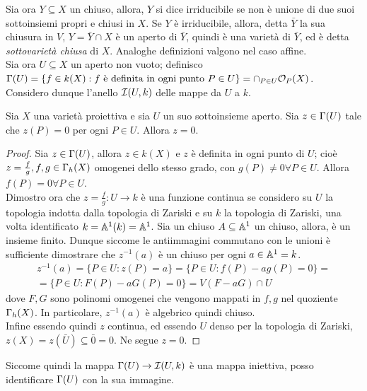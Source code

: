         Sia ora $Y \subseteq X$ un chiuso, allora, $Y$ si dice irriducibile se non è unione di due suoi sottoinsiemi propri e chiusi in $X$. Se $Y$ è irriducibile, allora, detta $\bar{Y}$ 
        la sua chiusura in $V$, $Y = \bar{Y} \cap X$ è un aperto di $\bar{Y}$, quindi è una varietà di $\bar{Y}$, ed è detta \emph{sottovarietà chiusa} di $X$.
        Analoghe definizioni valgono nel caso affine. \\
        Sia ora $U \subseteq X$ un aperto non vuoto; definisco $\Gamma(U) = \{f \in k(X) : f \text{ è definita in ogni punto } P \in U\} = \cap_{P \in U} \mathcal{O}_P(X)$. \\
        Considero dunque l'anello $\mathcal{I}(U,k)$ delle mappe da $U$ a $k$.
        \begin{lemma}\label{lem:gamma-cont}
            Sia $X$ una varietà proiettiva e sia $U$ un suo sottoinsieme aperto. Sia $z \in \Gamma(U)$ tale che $z(P) = 0$ per ogni $P \in U$. Allora $z = 0$.
        \end{lemma}
        \begin{proof}
            Sia $z \in \Gamma(U)$, allora $z \in k(X)$ e $z$ è definita in ogni punto di $U$; cioè $z = \frac{f}{g}, f,g \in \Gamma_h(X)$ omogenei dello stesso grado, con $g(P) \neq 0 \forall P \in U$.
            Allora $f(P) = 0 \forall P \in U$. \\
            Dimostro ora che $z = \frac{f}{g} : U \to k$ è una funzione continua se considero su $U$ la topologia indotta dalla topologia di Zariski e su $k$ la topologia di Zariski, una volta 
            identificato $k = \mathbb{A}^1(k) = \mathbb{A}^1$. Sia un chiuso $A \subseteq \mathbb{A}^1$ un chiuso, allora, è un insieme finito. Dunque siccome le antiimmagini commutano con le unioni è sufficiente dimostrare 
            che $z^{-1}(a)$ è un chiuso per ogni $a \in \mathbb{A}^1 = k$. \begin{multline*}
                z^{-1}(a) = \{P \in U : z(P) = a\} = \{P \in U : f(P) -ag(P) = 0\} = \\ = \{P \in U : F(P) - aG(P) = 0\} = V(F-aG) \cap U
            \end{multline*}
            dove $F,G$ sono polinomi omogenei che vengono mappati in $f,g$ nel quoziente $\Gamma_h(X)$. In particolare, $z^{-1}(a)$ è algebrico quindi chiuso.\\
            Infine essendo quindi $z$ continua, ed essendo $U$ denso per la topologia di Zariski, $z(X) = z(\bar{U}) \subseteq \bar{0} = 0$. Ne segue $z = 0$.
        \end{proof}
        Siccome quindi la mappa $\Gamma(U) \to \mathcal{I}(U,k)$ è una mappa iniettiva, posso identificare $\Gamma(U)$ con la sua immagine. \\
